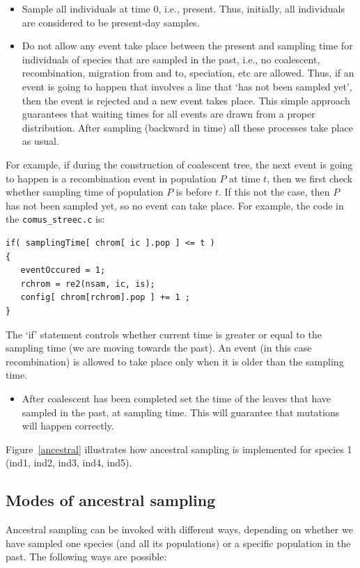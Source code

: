 \begin{itemize}
\item  Sample all individuals at time 0, i.e., present. Thus, initially, all individuals are considered to be present-day samples.
\item Do not allow any event take place between the present and sampling time for individuals of species that are sampled in the past, i.e., no coalescent, recombination, migration from and to, speciation, etc are allowed.  Thus, if an event is going to happen that involves a line that `has not been sampled yet', then the event is rejected and a new event takes place. This simple approach guarantees that waiting times for all events are drawn from a proper distribution. After sampling (backward in time) all these processes take place as usual. 
\end{itemize}

For example, if during the construction of coalescent tree, the next event is going to happen is a recombination event in population $P$ at time $t$, then we first check whether sampling time of population $P$ is before $t$. If this not the case, then $P$ has not been sampled yet, so no event can take place. For example, the code in the \verb!comus_streec.c! is:

\begin{lstlisting}
if( samplingTime[ chrom[ ic ].pop ] <= t )
{
   eventOccured = 1;
   rchrom = re2(nsam, ic, is);                                                                            
   config[ chrom[rchrom].pop ] += 1 ;
}
\end{lstlisting}

The `if' statement controls whether current time is greater or equal to the sampling time (we are moving towards the past). An event (in this case recombination) is allowed to take place only when it is older than the sampling time. 

\begin{itemize}
\item After coalescent has been completed set the time of the leaves that have sampled in the past, at sampling time. This will guarantee that mutations will happen correctly. 
\end{itemize}

Figure~\ref{ancestral} illustrates how ancestral sampling is implemented for species 1 (ind1, ind2, ind3, ind4, ind5). 

\subsection{Modes of ancestral sampling}
Ancestral sampling can be invoked with different ways, depending on whether we have sampled one species (and all its populations) or a specific population in the past. The following ways are possible:

